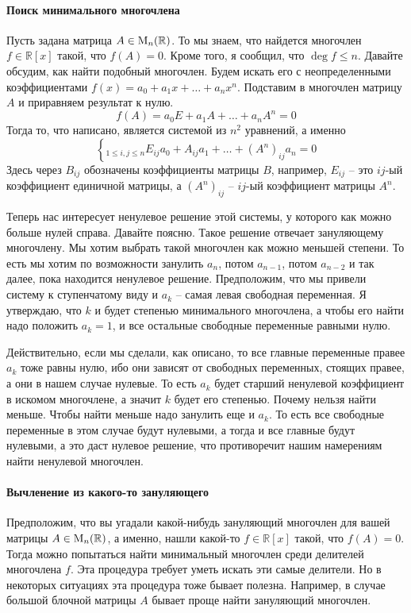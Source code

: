 \paragraph{Поиск минимального многочлена}

Пусть задана матрица $A\in \operatorname{M}_{n}(\mathbb R)$.
То мы знаем, что найдется многочлен $f\in\mathbb R[x]$ такой, что $f(A) = 0$.
Кроме того, я сообщил, что $\deg f\leqslant n$.
Давайте обсудим, как найти подобный многочлен.
Будем искать его с неопределенными коэффициентами $f(x) = a_0 + a_1 x + \ldots + a_n x^n$.
Подставим в многочлен матрицу $A$ и приравняем результат к нулю.
\[
f(A) = a_0 E + a_1 A + \ldots + a_n A^n = 0
\]
Тогда то, что написано, является системой из $n^2$ уравнений, а именно
\[
\left\{_{1\leqslant i,j\leqslant n}
E_{ij}a_0 + A_{ij}a_1 + \ldots + (A^n)_{ij}a_n = 0
\right.
\]
Здесь через $B_{ij}$ обозначены коэффициенты матрицы $B$, например, $E_{ij}$ -- это $ij$-ый коэффициент единичной матрицы, а $(A^n)_{ij}$ -- $ij$-ый коэффициент матрицы $A^n$.

Теперь нас интересует ненулевое решение этой системы, у которого как можно больше нулей справа.
Давайте поясню.
Такое решение отвечает зануляющему многочлену.
Мы хотим выбрать такой многочлен как можно меньшей степени.
То есть мы хотим по возможности занулить $a_n$, потом $a_{n-1}$, потом $a_{n-2}$ и так далее, пока находится ненулевое решение.
Предположим, что мы привели систему к ступенчатому виду и $a_k$ -- самая левая свободная переменная.
Я утверждаю, что $k$ и будет степенью минимального многочлена, а чтобы его найти надо положить $a_k = 1$, и все остальные свободные переменные равными нулю.

Действительно, если мы сделали, как описано, то все главные переменные правее $a_k$ тоже равны нулю, ибо они зависят от свободных переменных, стоящих правее, а они в нашем случае нулевые.
То есть $a_k$ будет старший ненулевой коэффициент в искомом многочлене, а значит $k$ будет его степенью.
Почему нельзя найти меньше.
Чтобы найти меньше надо занулить еще и $a_k$.
То есть все свободные переменные в этом случае будут нулевыми, а тогда и все главные будут нулевыми, а это даст нулевое решение, что противоречит нашим намерениям найти ненулевой многочлен.

\paragraph{Вычленение из какого-то зануляющего}

Предположим, что вы угадали какой-нибудь зануляющий многочлен для вашей матрицы $A\in\operatorname{M}_{n}(\mathbb R)$, а именно, нашли какой-то $f\in \mathbb R[x]$ такой, что $f(A) = 0$.
Тогда можно попытаться найти минимальный многочлен среди делителей многочлена $f$.
Эта процедура требует уметь искать эти самые делители.
Но в некоторых ситуациях эта процедура тоже бывает полезна.
Например, в случае большой блочной матрицы $A$ бывает проще найти зануляющий многочлен.

